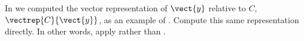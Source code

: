 In  we computed the vector representation of $\vect{y}$ relative to $C$, $\vectrep{C}{\vect{y}}$, as an example of .  Compute this same representation directly.  In other words, apply  rather than . 